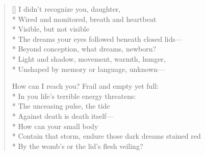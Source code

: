 \label{ch:emergency}
\settowidth{\versewidth}{Contain that storm, endure those dark dreams stained red}
\begin{verse}[\versewidth]
I didn't recognize you, daughter,\\*
Wired and monitored, breath and heartbeat\\*
Visible, but not visible\\*
The dreams your eyes followed beneath closed lids---\\*
Beyond conception, what dreams, newborn?\\*
Light and shadow, movement, warmth, hunger,\\*
Unshaped by memory or language, unknown---

How can I reach you?  Frail and empty yet full:\\*
In you life's terrible energy threatens:\\*
The unceasing pulse, the tide\\*
Against death is death itself---\\*
\hspace*{5\vgap} How can your small body\\*
Contain that storm, endure those dark dreams stained red\\*
By the womb's or the lid's flesh veiling?
\end{verse}
